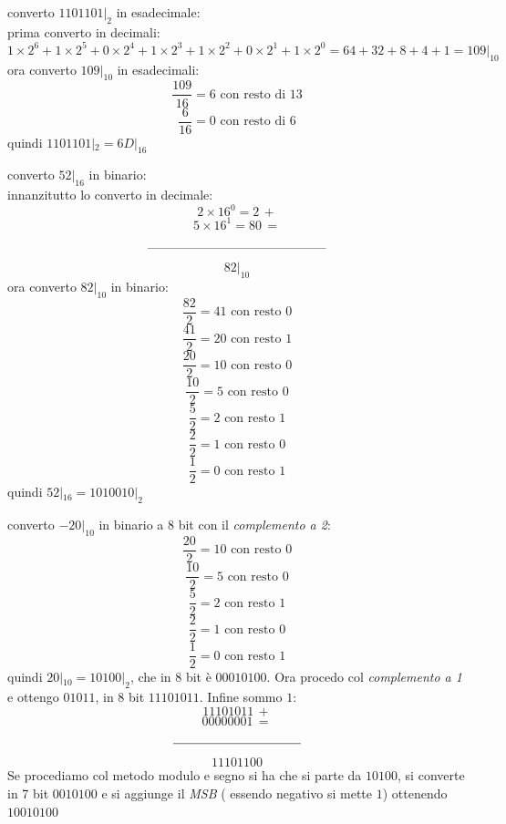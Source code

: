 \documentclass[a4paper,12pt, oneside]{book}
\begin{document}
\begin{esercizio}
  converto $1101101|_2$ in esadecimale:\\
  prima converto in decimali:
  $$1\times 2^6+ 1\times 2^5+ 0\times 2^4 +1 \times 2^3+ 1\times 2^2 +0\times 2^1+1\times 2^0=64+32+8+4+1=109|_{10}$$
  ora converto $109|_{10}$ in esadecimali:
  $$\frac{109}{16}=6 \mbox{ con resto di } 13$$
  $$\frac{6}{16}=0 \mbox{ con resto di } 6$$
  quindi $1101101|_2=6D|_{16}$
\end{esercizio}
\begin{esercizio}
  converto $52|_{16}$ in binario:\\
  innanzitutto lo converto in decimale:
  $$2\times 16^0=2\,+$$
  $$5\times 16^1= 80\,=$$
  $$\rule{140pt}{.4pt}$$
  $$82|_{10}$$
  ora converto $82|_{10}$ in binario:
  $$\frac{82}{2}=41 \mbox{ con resto } 0$$
  $$\frac{41}{2}=20 \mbox{ con resto } 1$$
  $$\frac{20}{2}=10 \mbox{ con resto } 0$$
  $$\frac{10}{2}=5 \mbox{ con resto } 0$$
  $$\frac{5}{2}=2 \mbox{ con resto } 1$$
  $$\frac{2}{2}=1 \mbox{ con resto } 0$$
  $$\frac{1}{2}=0 \mbox{ con resto } 1$$
  quindi $52|_{16}=1010010|_2$
\end{esercizio}
\begin{esercizio}
  converto $-20|_{10}$ in binario a 8 bit con il \textit{complemento a 2}:
  $$\frac{20}{2}=10 \mbox{ con resto } 0$$
  $$\frac{10}{2}=5 \mbox{ con resto } 0$$
  $$\frac{5}{2}=2 \mbox{ con resto } 1$$
  $$\frac{2}{2}=1 \mbox{ con resto } 0$$
  $$\frac{1}{2}=0 \mbox{ con resto } 1$$
  quindi $20|_{10}=10100|_2$, che in 8 bit è $00010100$. Ora procedo col \textit{complemento a 1} e ottengo $01011$, in 8 bit $11101011$. Infine sommo $1$:
  $$11101011\,+$$
  $$00000001\,=$$
  $$\rule{100pt}{.4pt}$$
  $$11101100$$
  Se procediamo col metodo modulo e segno si ha che si parte da $10100$, si converte in 7 bit $0010100$ e si aggiunge il \textit{MSB} ( essendo negativo si mette $1$) ottenendo $10010100$
\end{esercizio}
\end{document}
